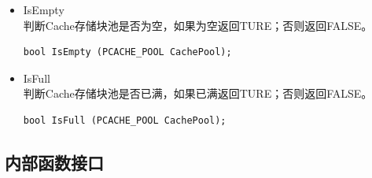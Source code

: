 \begin{itemize}
\item IsEmpty
\\判断Cache存储块池是否为空，如果为空返回TURE；否则返回FALSE。
\begin{lstlisting}
bool IsEmpty (PCACHE_POOL CachePool);
\end{lstlisting}

\item IsFull
\\判断Cache存储块池是否已满，如果已满返回TURE；否则返回FALSE。
\begin{lstlisting}
bool IsFull (PCACHE_POOL CachePool);
\end{lstlisting}

\end{itemize}

\subsection{内部函数接口}
